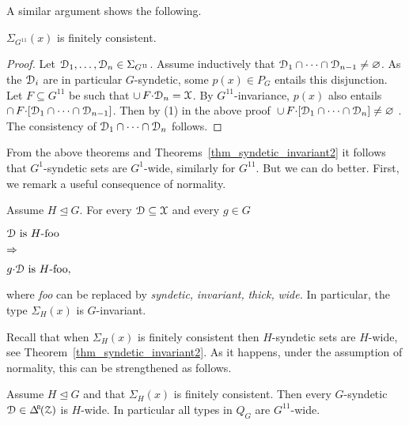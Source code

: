 A similar argument shows the following.

\begin{theorem}\label{thm_gammaP}
   $\Sigma_{G^{1\!1}}(x)$ is finitely consistent.
\end{theorem}

\begin{proof}
  \def\medrel#1{\parbox[t]{5ex}{$\displaystyle\hfil #1$}}
  \def\ceq#1#2#3{\parbox[t]{23ex}{$\displaystyle #1$}\medrel{#2}{$\displaystyle #3$}}   
  Let $\EuScript D_1,\dots,\EuScript D_n\in\Sigma_{G^{1\!1}}$.
  Assume inductively that $\EuScript D_1\cap\dots\cap\EuScript D_{n-1}\neq\varnothing$.
  As the $\EuScript D_i$ are in particular $G$-syndetic, some $p(x)\in P_G$ entails this disjunction.
  Let $F\subseteq G^{1\!1}$ be such that $\cup\,F{\cdot}\EuScript D_n=\EuScript X$.
  By $G^{1\!1}$-invariance, $p(x)$ also entails $\cap\, F{\cdot}[\EuScript D_1\cap\dots\cap\EuScript D_{n-1}]$.
  Then by (1) in the above proof $\,\cup\,F{\cdot}[\EuScript D_1\cap\dots\cap\EuScript D_n]\neq\varnothing$ .
  The consistency of $\EuScript D_1\cap\dots\cap\EuScript D_n$ follows.
\end{proof}


From the above theorems and Theorems~\ref{thm_syndetic_invariant2} it follows that $G^1$-syndetic sets are $G^1$-wide, similarly for $G^{1\!1}$.
But we can do better.
First, we remark a useful consequence of normality.

\begin{remark}\label{rem_invariance_normalsubg}
\def\medrel#1{\parbox[t]{5ex}{$\displaystyle\hfil #1$}}
\def\ceq#1#2#3{\parbox[t]{20ex}{$\displaystyle #1$}\medrel{#2}{$\displaystyle #3$}}
  Assume $H\trianglelefteq G$.
  For every $\EuScript D\subseteq\EuScript X$ and every $g\in G$ \smallskip
  
  \ceq{\hfill\D\textrm{ is }H\textrm{-foo}}{\Rightarrow}{g{\cdot}\D\textrm{ is }H\textrm{-foo},} \smallskip
  
  where \textit{foo\/} can be replaced by \textit{syndetic,} \textit{invariant,} \textit{thick,} \textit{wide.}
  In particular, the type $\Sigma_H(x)$ is $G$-invariant.
\end{remark}

Recall that when $\Sigma_H(x)$ is finitely consistent then $H$-syndetic sets are $H$-wide, see Theorem~\ref{thm_syndetic_invariant2}.
As it happens, under the assumption of normality, this can be strengthened as follows.

\begin{proposition}\label{prop_Gsyndetic_Hthick1}
  Assume $H\trianglelefteq G$ and that $\Sigma_H(x)$ is finitely consistent.
  Then every $G$-syn\-detic $\D\in\BDelta(\Z)$ is $H$-wide.
  In particular all types in $Q_G$ are $G^{1\!1}$-wide.
\end{proposition}

